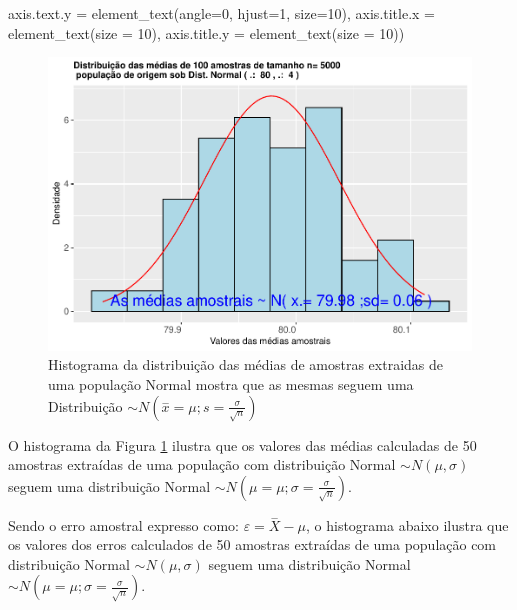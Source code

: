\documentclass[
]{book}
\newenvironment{Shaded}{\begin{snugshade}}{\end{snugshade}}
\newcommand{\AttributeTok}[1]{\textcolor[rgb]{0.77,0.63,0.00}{#1}}
\newcommand{\DecValTok}[1]{\textcolor[rgb]{0.00,0.00,0.81}{#1}}
\newcommand{\FunctionTok}[1]{\textcolor[rgb]{0.00,0.00,0.00}{#1}}
\newcommand{\NormalTok}[1]{#1}
\begin{document}
\begin{Shaded}
\begin{Highlighting}[]
        \AttributeTok{axis.text.y =} \FunctionTok{element\_text}\NormalTok{(}\AttributeTok{angle=}\DecValTok{0}\NormalTok{, }\AttributeTok{hjust=}\DecValTok{1}\NormalTok{, }\AttributeTok{size=}\DecValTok{10}\NormalTok{),}
        \AttributeTok{axis.title.x =} \FunctionTok{element\_text}\NormalTok{(}\AttributeTok{size =} \DecValTok{10}\NormalTok{),}
        \AttributeTok{axis.title.y =} \FunctionTok{element\_text}\NormalTok{(}\AttributeTok{size =} \DecValTok{10}\NormalTok{))}
\end{Highlighting}
\end{Shaded}

\begin{figure}

{\centering \includegraphics[width=1\linewidth]{apostila_files/figure-latex/fig51-1} 

}

\caption{Histograma da distribuição das médias de amostras extraidas de uma população  Normal mostra que as mesmas seguem uma Distribuição $\sim N (\stackrel{-}{x}= \mu; s=\frac{\sigma}{\sqrt{n}})$}\label{fig:fig51}
\end{figure}

\hfill\break

O histograma da Figura \ref{fig:fig51} ilustra que os valores das médias calculadas de 50 amostras extraídas de uma população com distribuição Normal \(\sim N (\mu, \sigma)\) seguem uma distribuição Normal \(\sim N (\mu= \mu; \sigma=\frac{\sigma}{\sqrt{n}})\).

\hfill\break

Sendo o erro amostral expresso como: \(\varepsilon=\stackrel{-}{X} - \mu\), o histograma abaixo ilustra que os valores dos erros calculados de 50 amostras extraídas de uma população com distribuição Normal \(\sim N (\mu, \sigma)\) seguem uma distribuição Normal \(\sim N (\mu= \mu; \sigma=\frac{\sigma}{\sqrt{n}})\).
\end{document}
